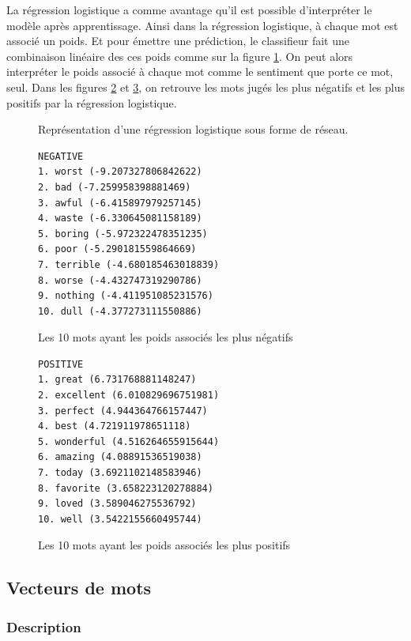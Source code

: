\documentclass{article}
\begin{document}
La régression logistique a comme avantage qu'il est possible d'interpréter le modèle après apprentissage. Ainsi dans la régression logistique, à chaque mot est associé un poids. Et pour émettre une prédiction, le classifieur fait une combinaison linéaire des ces poids comme sur la figure \ref{lr_net}. On peut alors interpréter le poids associé à chaque mot comme le sentiment que porte ce mot, seul. Dans les figures \ref{negative} et \ref{positive}, on retrouve les mots jugés les plus négatifs et les plus positifs par la régression logistique.

\begin{figure}[h]
\begin{center}

\end{center}
\caption{Représentation d'une régression logistique sous forme de réseau.}
\label{lr_net}
\end{figure}

\begin{figure}[h]
\begin{verbatim}
NEGATIVE
1. worst (-9.207327806842622)
2. bad (-7.259958398881469)
3. awful (-6.415897979257145)
4. waste (-6.330645081158189)
5. boring (-5.972322478351235)
6. poor (-5.290181559864669)
7. terrible (-4.680185463018839)
8. worse (-4.432747319290786)
9. nothing (-4.411951085231576)
10. dull (-4.377273111550886)
\end{verbatim}
\caption{Les 10 mots ayant les poids associés les plus négatifs}
\label{negative}
\end{figure}

\begin{figure}[h]
\begin{verbatim}
POSITIVE
1. great (6.731768881148247)
2. excellent (6.010829696751981)
3. perfect (4.944364766157447)
4. best (4.721911978651118)
5. wonderful (4.516264655915644)
6. amazing (4.08891536519038)
7. today (3.6921102148583946)
8. favorite (3.658223120278884)
9. loved (3.589046275536792)
10. well (3.5422155660495744)
\end{verbatim}
\caption{Les 10 mots ayant les poids associés les plus positifs}
\label{positive}
\end{figure}

\subsection{Vecteurs de mots}

\subsubsection{Description}
\end{document}
